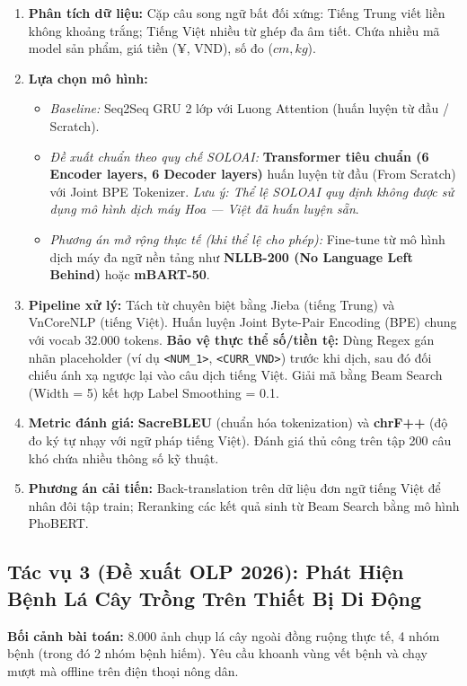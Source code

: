 \documentclass[10pt,a4paper]{article}
\begin{document}
\begin{enumerate}[leftmargin=*]
    \item \textbf{Phân tích dữ liệu:} Cặp câu song ngữ bất đối xứng: Tiếng Trung viết liền không khoảng trắng; Tiếng Việt nhiều từ ghép đa âm tiết. Chứa nhiều mã model sản phẩm, giá tiền (¥, VND), số đo ($cm, kg$).
    \item \textbf{Lựa chọn mô hình:}
    \begin{itemize}
        \item \textit{Baseline:} Seq2Seq GRU 2 lớp với Luong Attention (huấn luyện từ đầu / Scratch).
        \item \textit{Đề xuất chuẩn theo quy chế SOLOAI:} \textbf{Transformer tiêu chuẩn (6 Encoder layers, 6 Decoder layers)} huấn luyện từ đầu (From Scratch) với Joint BPE Tokenizer. \textit{Lưu ý: Thể lệ SOLOAI quy định không được sử dụng mô hình dịch máy Hoa --- Việt đã huấn luyện sẵn}.
        \item \textit{Phương án mở rộng thực tế (khi thể lệ cho phép):} Fine-tune từ mô hình dịch máy đa ngữ nền tảng như \textbf{NLLB-200 (No Language Left Behind)} hoặc \textbf{mBART-50}.
    \end{itemize}
    \item \textbf{Pipeline xử lý:} Tách từ chuyên biệt bằng Jieba (tiếng Trung) và VnCoreNLP (tiếng Việt). Huấn luyện Joint Byte-Pair Encoding (BPE) chung với vocab 32.000 tokens. \textbf{Bảo vệ thực thể số/tiền tệ:} Dùng Regex gán nhãn placeholder (ví dụ \texttt{<NUM\_1>}, \texttt{<CURR\_VND>}) trước khi dịch, sau đó đối chiếu ánh xạ ngược lại vào câu dịch tiếng Việt. Giải mã bằng Beam Search (Width = 5) kết hợp Label Smoothing = 0.1.
    \item \textbf{Metric đánh giá:} \textbf{SacreBLEU} (chuẩn hóa tokenization) và \textbf{chrF++} (độ đo ký tự nhạy với ngữ pháp tiếng Việt). Đánh giá thủ công trên tập 200 câu khó chứa nhiều thông số kỹ thuật.
    \item \textbf{Phương án cải tiến:} Back-translation trên dữ liệu đơn ngữ tiếng Việt để nhân đôi tập train; Reranking các kết quả sinh từ Beam Search bằng mô hình PhoBERT.
\end{enumerate}

\subsection{Tác vụ 3 (Đề xuất OLP 2026): Phát Hiện Bệnh Lá Cây Trồng Trên Thiết Bị Di Động}
\textbf{Bối cảnh bài toán:} 8.000 ảnh chụp lá cây ngoài đồng ruộng thực tế, 4 nhóm bệnh (trong đó 2 nhóm bệnh hiếm). Yêu cầu khoanh vùng vết bệnh và chạy mượt mà offline trên điện thoại nông dân.
\end{document}
